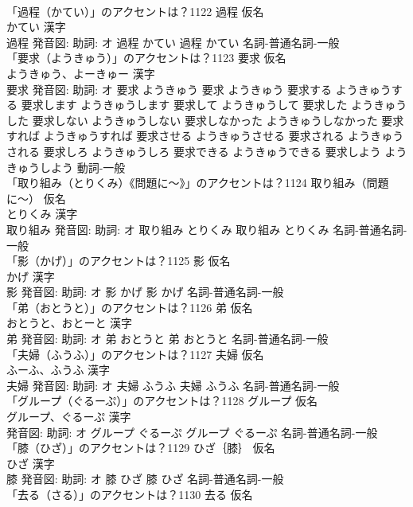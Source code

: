 \documentclass[8pt]{extreport}
\begin{document}
\begin{CJK}{UTF8}{min}
\\	「過程（かてい）」のアクセントは？1122	過程 仮名　
\\	かてい 漢字　
\\	過程 発音図: 助詞: オ	過程 かてい		過程 かてい				名詞-普通名詞-一般 
\\	「要求（ようきゅう）」のアクセントは？1123	要求 仮名　
\\	ようきゅう、よーきゅー 漢字　
\\	要求 発音図: 助詞: オ	要求 ようきゅう		要求 ようきゅう 要求する ようきゅうする 要求します ようきゅうします 要求して ようきゅうして 要求した ようきゅうした 要求しない ようきゅうしない 要求しなかった ようきゅうしなかった 要求すれば ようきゅうすれば 要求させる ようきゅうさせる 要求される ようきゅうされる 要求しろ ようきゅうしろ 要求できる ようきゅうできる 要求しよう ようきゅうしよう				動詞-一般 
\\	「取り組み（とりくみ）《問題に〜》」のアクセントは？1124	取り組み（問題に〜） 仮名　
\\	とりくみ 漢字　
\\	取り組み 発音図: 助詞: オ	取り組み とりくみ		取り組み とりくみ				名詞-普通名詞-一般 
\\	「影（かげ）」のアクセントは？1125	影 仮名　
\\	かげ 漢字　
\\	影 発音図: 助詞: オ	影 かげ		影 かげ				名詞-普通名詞-一般 
\\	「弟（おとうと）」のアクセントは？1126	弟 仮名　
\\	おとうと、おとーと 漢字　
\\	弟 発音図: 助詞: オ	弟 おとうと		弟 おとうと				名詞-普通名詞-一般 
\\	「夫婦（ふうふ）」のアクセントは？1127	夫婦 仮名　
\\	ふーふ、ふうふ 漢字　
\\	夫婦 発音図: 助詞: オ	夫婦 ふうふ		夫婦 ふうふ				名詞-普通名詞-一般 
\\	「グループ（ぐるーぷ）」のアクセントは？1128	グループ 仮名　
\\	グループ、ぐるーぷ 漢字　
\\	発音図: 助詞: オ	グループ ぐるーぷ		グループ ぐるーぷ				名詞-普通名詞-一般 
\\	「膝（ひざ）」のアクセントは？1129	ひざ｛膝｝ 仮名　
\\	ひざ 漢字　
\\	膝 発音図: 助詞: オ	膝 ひざ		膝 ひざ				名詞-普通名詞-一般 
\\	「去る（さる）」のアクセントは？1130	去る 仮名　

\end{CJK}
\end{document}

